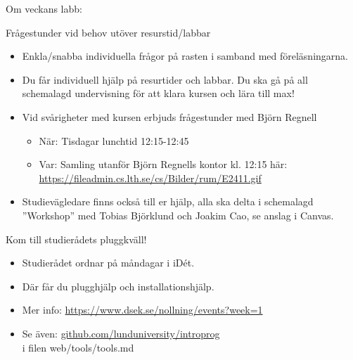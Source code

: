 \begin{SlideExtra}{Om veckans labb: }
\begin{itemize}

\end{itemize}
\end{SlideExtra}

\begin{SlideExtra}{Frågestunder vid behov utöver resurstid/labbar}\SlideFontSmall
\begin{itemize}
  \item Enkla/snabba individuella frågor på rasten i samband med föreläsningarna.
  \item Du får individuell hjälp på resurtider och labbar. Du ska gå på all schemalagd undervisning för att klara kursen och lära till max!
  \item Vid svårigheter med kursen erbjuds frågestunder med Björn Regnell
  \begin{itemize}\SlideFontTiny
    \item När: Tisdagar lunchtid 12:15-12:45
    \item Var: Samling utanför Björn Regnells kontor kl. 12:15 här:\\
    {\footnotesize\url{https://fileadmin.cs.lth.se/cs/Bilder/rum/E2411.gif}}
\end{itemize}  
  \item Studievägledare finns också till er hjälp, alla ska delta i schemalagd ''Workshop'' med Tobias Björklund och Joakim Cao, se anslag i Canvas.
\end{itemize}
\end{SlideExtra}


\begin{SlideExtra}{Kom till studierådets pluggkväll!}
\begin{itemize}
  \item Studierådet ordnar  på måndagar i iDét.
  \item Där får du plugghjälp och installationshjälp.
  \item Mer info: \url{https://www.dsek.se/nollning/events?week=1}
  \item Se även: \href{https://github.com/lunduniversity/introprog/blob/master/web/tools/tools.md}{github.com/lunduniversity/introprog}\\i filen web/tools/tools.md
\end{itemize}  
\end{SlideExtra}

